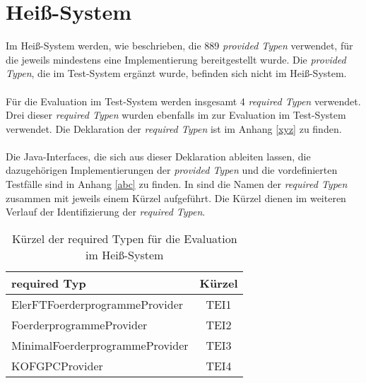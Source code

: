 \section{Heiß-System}\label{sec_hotsystem}
Im Heiß-System werden, wie beschrieben, die 889 \emph{provided Typen} verwendet, für die jeweils mindestens eine Implementierung bereitgestellt wurde. Die \emph{provided Typen}, die im Test-System ergänzt wurde, befinden sich nicht im Heiß-System.
\\\\
Für die Evaluation im Test-System werden insgesamt 4 \emph{required Typen} verwendet. Drei dieser \emph{required Typen} wurden ebenfalls im zur Evaluation im Test-System verwendet. Die Deklaration der \emph{required Typen} ist im Anhang \ref{xyz} zu finden.  
\\\\
Die Java-Interfaces, die sich aus dieser Deklaration ableiten lassen, die dazugehörigen Implementierungen der \emph{provided Typen} und die vordefinierten Testfälle sind in Anhang \ref{abc} zu finden.
In  sind die Namen der \emph{required Typen} zusammen mit jeweils einem Kürzel aufgeführt. Die Kürzel dienen im weiteren Verlauf der Identifizierung der \emph{required Typen}.
\begin{table}[h!]
\centering
\small
\begin{tabular}{|l|c|}
\hline
\hline
\centering\textbf{required Typ} & \textbf{Kürzel} \\
\hline
\hline
ElerFTFoerderprogrammeProvider & TEI1\\
\hline
FoerderprogrammeProvider & TEI2\\
\hline
MinimalFoerderprogrammeProvider & TEI3\\
\hline
KOFGPCProvider & TEI4\\
\hline
\hline
\end{tabular}
\caption{Kürzel der required Typen für die Evaluation im Heiß-System}
 \label{tab:eIMainShort}
\end{table}
\noindent


